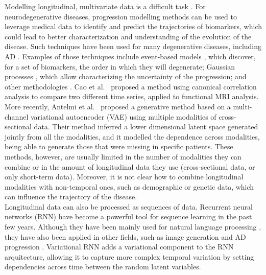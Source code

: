 Modelling longitudinal, multivariate data is a difficult task \cite{Verbeke2014}. For neurodegenerative diseases, progression modelling methods can be used to leverage medical data to identify and predict the trajectories of biomarkers, which could lead to better characterization and understanding of the evolution of the disease. Such techniques have been used for many degenerative diseases, including AD \cite{Oxtoby2017,Marti-Juan2020,Lei2020,Fisher2019}. Examples of those techniques include event-based models \cite{Young2014,Young2015a,Fonteijn2012}, which discover, for a set of biomarkers, the order in which they will degenerate; Gaussian processes \cite{Lorenzi2015b,Hyun2016,Lorenzi2019}, which allow characterizing the uncertainty of the progression; and other methodologies \cite{Marinescu2019, Young2017}. Cao et al.\ \cite{Cao2019} proposed a method using canonical correlation analysis to compare two different time series, applied to functional MRI analysis. More recently, Antelmi et al.\ \cite{Antelmi2019} proposed a generative method based on a multi-channel variational autoencoder (VAE) using multiple modalities of cross-sectional data. Their method inferred a lower dimensional latent space generated jointly from all the modalities, and it modelled the dependence across modalities, being able to generate those that were missing in specific patients. These methods, however, are usually limited in the number of modalities they can combine or in the amount of longitudinal data they use (cross-sectional data, or only short-term data). Moreover, it is not clear how to combine longitudinal modalities with non-temporal ones, such as demographic or genetic data, which can influence the trajectory of the disease. \\

Longitudinal data can also be processed as sequences of data. Recurrent neural networks (RNN) \cite{Hochreiter1997} have become a powerful tool for sequence learning in the past few years. Although they have been mainly used for natural language processing \cite{Goldberg2017}, they have also been applied in other fields, such as image generation \cite{Gregor2015a} and AD progression \cite{Wang2018,Ghazi2019}. Variational RNN \cite{Chung2015,Fabius2015} adds a variational component to the RNN arquitecture, allowing it to capture more complex temporal variation by setting dependencies across time between the random latent variables. \\ 


